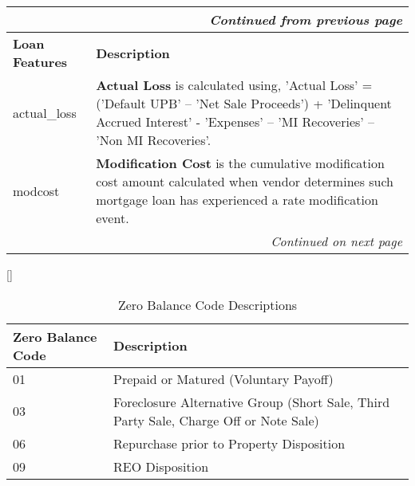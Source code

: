 \begin{appendices}
\begin{center}
\begin{tabular}{|p{4cm}|p{10cm}|}
            \end{tabular}
    \end{center}
    
    \begin{center}
    \centering
        \begin{tabular}{|p{4cm}|p{10cm}|}
            \multicolumn{2}{r}{\textit{Continued from previous page}} \\
            \hline \textbf{Loan Features} & \textbf{Description} \\ \hline \hline
            actual\_loss & \textbf{Actual Loss} is calculated using, 'Actual Loss' = ('Default UPB' – 'Net Sale Proceeds') + 'Delinquent Accrued Interest' - 'Expenses' – 'MI Recoveries' – 'Non MI Recoveries'. \\ \hline  
            modcost & \textbf{Modification Cost} is the cumulative modification cost amount calculated when vendor determines such mortgage loan has experienced a rate modification event. \\ \hline   
            \multicolumn{2}{r}{\textit{Continued on next page}} \\
        
        \end{tabular}
    \end{center}
    \footnotesize{[]}

    
    
    
    
    
    
    
    
    

    
    

    \begin{table}[h]
    \centering
    \caption{Zero Balance Code Descriptions} \vspace{0.5cm}
    \label{appendix: zero_balance_codes}
        \begin{tabular}{|p{4.5cm}|p{9.5cm}|}
            \hline \textbf{Zero Balance Code} & \textbf{Description} \\ \hline \hline
            01            & Prepaid or Matured (Voluntary Payoff) \\ \hline
            03 & Foreclosure Alternative Group (Short Sale, Third Party Sale, Charge Off or Note Sale) \\ \hline
            06 & Repurchase prior to Property Disposition \\ \hline
            09 & REO Disposition \\ \hline
            \end{tabular}
        

\end{table}
\end{appendices}
